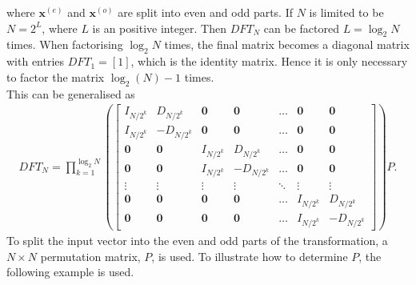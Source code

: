 where $\mathbf{x}^{(e)}$ and $\mathbf{x}^{(o)}$ are split into even and odd parts.  
If $N$ is limited to be $N=2^L$, where $L$ is an positive integer. Then $DFT_N$ can be factored $L=\log_2 N$ times. When factorising $\log_2 N$ times, the final matrix becomes a diagonal matrix with entries $DFT_1=[1]$, which is the identity matrix. Hence it is only necessary to factor the matrix $\log_2(N) - 1$ times. \cite[68-69]{ryan2019linear}\\
This can be generalised as
\begin{align*}
    DFT_N=\prod_{k=1}^{\log_2 N}\left(
    \begin{bmatrix}
    I_{N/2^k}  & D_{N/2^k}  & \mathbf{0} & \mathbf{0} & \hdots & \mathbf{0} & \mathbf{0}\\
    I_{N/2^k}  & -D_{N/2^k} & \mathbf{0} & \mathbf{0} & \hdots & \mathbf{0} & \mathbf{0}\\
    \mathbf{0} & \mathbf{0} & I_{N/2^k}  & D_{N/2^k}  & \hdots & \mathbf{0} & \mathbf{0}\\
    \mathbf{0} & \mathbf{0} & I_{N/2^k}  & -D_{N/2^k} & \hdots & \mathbf{0} & \mathbf{0}\\
    \vdots     & \vdots     & \vdots     & \vdots     & \ddots & \vdots     & \vdots    \\
    \mathbf{0} & \mathbf{0} & \mathbf{0} & \mathbf{0} & \hdots & I_{N/2^k}  & D_{N/2^k} \\
    \mathbf{0} & \mathbf{0} & \mathbf{0} & \mathbf{0} & \hdots & I_{N/2^k}  & -D_{N/2^k}
    \end{bmatrix}
    \right)P.
\end{align*}
To split the input vector into the even and odd parts of the transformation, a $N\times N$ permutation matrix, $P$, is used. To illustrate how to determine $P$, the following example is used. 

